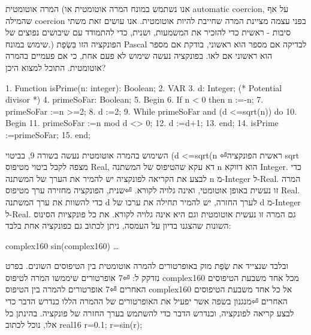\begin{טבלא}[!htbp]
      המרה אוטומטית
      (אנו נשתמש במונח המרה אוטומטית או automatic coercion, על אף שהמילה coercion בפני עצמה מציינת המרה שחייבת להיות אוטומטית. אנו עושים זאת משתי סיבות - ראשית כדי להזכיר את המשמעות, ושנית, כדי להתמודד עם שיבושים נפוצים של שימוש במונח.)
      הפונקציה הזו בִּשְׂפַת Pascal לבדיקה אם מספר הוא ראשוני, בודקת אם מספר הוא ראשוני אם לאו. בפונקציה נעשה שימוש לא פעם אחת, כי אם פעמיים בהמרה אוטומטית. התוכל למצוא היכן?

      1. Function isPrime(n: integer): Boolean;
      2. VAR
      3. d: Integer; (* Potential divisor *)
      4. primeSoFar: Boolean;
      5. Begin
      6. If n < 0 then n :=-n;
      7. primeSoFar :=n >=2;
      8. d :=2;
      9. While primeSoFar and (d <=sqrt(n)) do
      10. Begin
      11. primeSoFar :=n mod d <> 0;
      12. d :=d+1;
      13. end;
      14. isPrime :=primeSoFar;
      15. end;

      השימוש בהמרה אוטומטית נעשה בשורה 9, בביטוי
      (d <=sqrt(n
⏎ראשית הפונקציה sqrt מצפה לקבל ביטוי מטיפוס Real, דא עקא שהטיפוס של המשתנה n הוא דווקא Integer. כדי לבצע את הקריאה לפונקציה יש להמיר את הערך של המשתנה n מ-Integer ל-Real. המרה זו נעשית באופן אוטומטי, ואינה גלויה לקורא.
⏎שנית, הפונקציה מחזירה ערך מטיפוס Real. כדי להשוות את ערך המשתנה d לערך החזרה, יש להמיר תחילה את ערכו של d מ-Integer ל-Real. גם המרה זו נעשית אוטומטית וגם היא אינה גלויה לקורא.
      את כל פונקציות הסינוס השונות שהצגנו בדיון על העמסה, ניתן לכתוב גם כפונקציה אחת בלבד:

      complex160 sin(complex160) {…}

      ובלבד שנצייד את שְׂפַת מוק באופרטורים להמרה אוטומטית בין הטיפוסים השונים.
      בפרט נזדקק ל:
⏎7 אופרטורים שיממשו המרה לטיפוס complex160 מכל אחד משבעת הטיפוסים האחרים
⏎7 אופרטורים להמרה בין הטיפוס complex160 אל כל אחד משבעת הטיפוסים האחרים
⏎מנגנון בשפה אשר יפעיל את האופרטורים של ההמרה הללו כנדרש הדבר כדי לבצע קריאה לפונקציה, וכנדרש הדבר כדי להשתמש בערך החזרה של פונקציה.
      בהינתן כל אלו, נוכל לכתוב
      real16 r=0.1;
      r=sin(r);


\end{טבלא}
